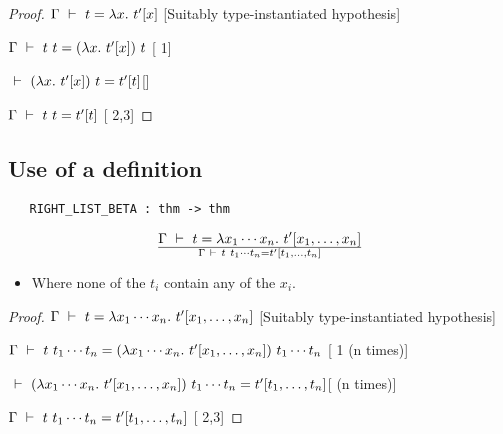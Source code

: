 \vspace{12pt plus2pt minus1pt}

\begin{proof}
\item $\Gamma\ \vdash\  t = \lambda x.\  t'[x]$\hfill
[Suitably type-instantiated hypothesis]
\item $\Gamma\ \vdash\  t\ t =
(\lambda x.\ t'[x])\ t$\hfill
[ 1]
\item $\ \vdash\ (\lambda x.\ t'[x])\ t =
t'[t]$\hfill []
\item $\Gamma\ \vdash\  t\ t = t'[t]$\hfill
[ 2,3]
\end{proof}


\subsection{Use of a definition}

\begin{holboxed}
\begin{verbatim}
   RIGHT_LIST_BETA : thm -> thm
\end{verbatim}\end{holboxed}

\vspace{12pt plus2pt minus1pt}

$$\Gamma\ \vdash\  t = \lambda x_1\cdots x_n.\ t'[x_1,\ldots,x_n]
\over \Gamma\ \vdash\  t\ t_1\cdots t_n = t'[t_1,\ldots,t_n]$$
\begin{itemize}
\item Where none of the $t_i$ contain any of the $x_i$.
\end{itemize}

\vspace{12pt plus2pt minus1pt}

\begin{proof}
\item $\Gamma\ \vdash\  t = \lambda x_1\cdots x_n.\  t'[x_1,\ldots,x_n]$\hfill
[Suitably type-instantiated hypothesis]
\item $\Gamma\ \vdash\  t\ t_1\cdots t_n =
(\lambda x_1\cdots x_n.\ t'[x_1,\ldots,x_n])\ t_1\cdots t_n$\hfill
[ 1 (n times)]
\item $\ \vdash\ (\lambda x_1\cdots x_n.\ t'[x_1,\ldots,x_n])\ t_1\cdots t_n =
t'[t_1,\ldots,t_n]$\hfill [ (n times)]
\item $\Gamma\ \vdash\  t\ t_1\cdots t_n = t'[t_1,\ldots,t_n]$\hfill
[ 2,3]
\end{proof}






